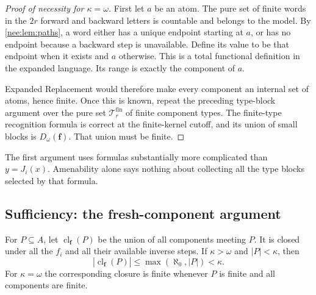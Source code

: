 \documentclass[11pt,letterpaper]{article}
\numberwithin{equation}{section}
\theoremstyle{plain}
\theoremstyle{definition}
\theoremstyle{remark}
\begin{document}
\begin{proof}[Proof of necessity for $\kappa=\omega$]
First let $a$ be an atom. The pure set of finite words in the $2r$ forward and backward letters is countable and belongs to the model. By \cref{nee:lem:paths}, a word either has a unique endpoint starting at $a$, or has no endpoint because a backward step is unavailable. Define its value to be that endpoint when it exists and $a$ otherwise. This is a total functional definition in the expanded language. Its range is exactly the component of $a$.

Expanded Replacement would therefore make every component an internal set of atoms, hence finite. Once this is known, repeat the preceding type-block argument over the pure set $\mathcal T_r^{\mathrm{fin}}$ of finite component types. The finite-type recognition formula is correct at the finite-kernel cutoff, and its union of small blocks is $D_\omega(\boldsymbol f)$. That union must be finite.
\end{proof}

The first argument uses formulas substantially more complicated than $y=J_i(x)$. Amenability alone says nothing about collecting all the type blocks selected by that formula.

\subsection{Sufficiency: the fresh-component argument}
For $P\subseteq A$, let $\operatorname{cl}_{\boldsymbol f}(P)$ be the union of all components meeting $P$. It is closed under all the $f_i$ and all their available inverse steps. If $\kappa>\omega$ and $|P|<\kappa$, then
\begin{equation}\label{nee:eq:closurebound}
|\operatorname{cl}_{\boldsymbol f}(P)|\leq\max(\aleph_0,|P|)<\kappa.
\end{equation}
For $\kappa=\omega$ the corresponding closure is finite whenever $P$ is finite and all components are finite.
\end{document}
